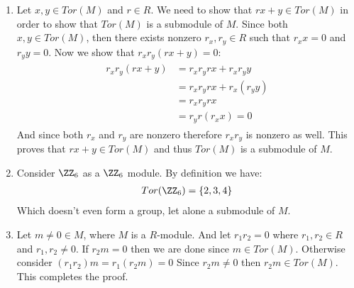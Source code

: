 \begin{enumerate}[label=\ilabel]
    \item 
        Let $x, y \in Tor(M)$ and $r \in R$. We need to show that $rx + y \in Tor(M)$ in order to show that $Tor(M)$ is a submodule of $M$. Since both $x, y \in Tor(M)$, then there exists nonzero $r_x, r_y \in R$ such that $r_x x = 0$ and $r_y y = 0$. Now we show that $r_x r_y (rx + y) = 0$:
        \begin{gather*}
            \begin{split}
                r_x r_y (rx + y) & = r_x r_y rx + r_x r_y y \\
                & = r_x r_y rx + r_x (r_y y) \\
                & = r_x r_y rx  \\
                & = r_y r (r_x x) = 0 
            \end{split}
        \end{gather*}
        And since both $r_x$ and $r_y$ are nonzero therefore $r_x r_y$ is nonzero as well. This proves that $rx + y \in Tor(M)$ and thus $Tor(M)$ is a submodule of $M$.
    
    \item
        Consider $\ZZ_6$ as a $\ZZ_6$ module. By definition we have:
        \begin{gather*}
            Tor(\ZZ_6) = \{2, 3, 4\}
        \end{gather*}
        Which doesn't even form a group, let alone a submodule of $M$.

    \item
        Let $m \ne 0 \in M$, where $M$ is a $R$-module. And let $r_1 r_2 = 0$ where $r_1, r_2 \in R$ and $r_1, r_2 \ne 0$.
        If $r_2 m = 0$ then we are done since $m \in Tor(M)$. Otherwise consider $(r_1 r_2) m = r_1 (r_2m) = 0$ Since $r_2 m \ne 0$ then $r_2m \in Tor(M)$. This completes the proof.
\end{enumerate}